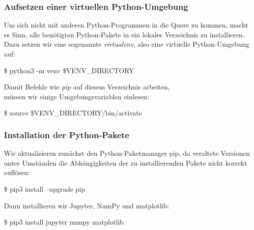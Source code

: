 \documentclass{beamer}
\begin{document}
\begin{frame}
  \frametitle{Aufsetzen einer virtuellen Python-Umgebung}
  Um sich nicht mit anderen Python-Programmen in die Quere zu kommen,
  macht es Sinn, alle ben\"otigten Python-Pakete in ein lokales Verzeichnis
  zu installieren.
  Dazu setzen wir eine sogenannte \emph{virtualenv}, also eine virtuelle
  Python-Umgebung auf:
  \begin{semiverbatim}
    \$ python3 -m venv \$VENV\_DIRECTORY
  \end{semiverbatim}
  Damit Befehle wie \emph{pip} auf diesem Verzeichnis arbeiten, \\
  m\"ussen wir einige Umgebungsvariablen einlesen:
  \begin{semiverbatim}
    \$ source \$VENV\_DIRECTORY/bin/activate
  \end{semiverbatim}
\end{frame}

\begin{frame}
  \frametitle{Installation der Python-Pakete}
  Wir aktualisieren zun\"achst den Python-Paketmanager pip,
  da veraltete Versionen unter Umst\"anden die Abh\"angigkeiten
  der zu installierenden Pakete nicht korrekt aufl\"osen:
  \begin{semiverbatim}
    \$ pip3 install --upgrade pip
  \end{semiverbatim}
  Dann installieren wir Jupyter, NumPy und matplotlib:
  \begin{semiverbatim}
    \$ pip3 install jupyter numpy matplotlib
  \end{semiverbatim}
\end{frame}
\end{document}
